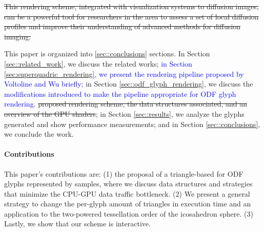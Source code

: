 \documentclass[twoside,twocolumn,10pt]{article}
\begin{document}
\sout{This rendering scheme, integrated with visualization systems to diffusion images, can be a powerful tool for researchers in the area to assess a set of local diffusion profiles and improve their understanding of advanced methods for diffusion imaging.}

This paper is organized into \ref{sec::conclusions} sections. In Section \ref{sec::related_work}, we discuss the related works; \textcolor{blue}{in Section \ref{sec:superquadric_rendering}, we present the rendering pipeline proposed by Voltoline and Wu briefly;} in Section \ref{sec::odf_glyph_rendering}, we discuss the \textcolor{blue}{modifications introduced to make the pipeline appropriate for ODF glyph rendering.} \sout{proposed rendering scheme, the data structures associated, and an overview of the GPU shaders}; in Section \ref{sec::results}, we analyze the glyphs generated and show performance measurements; and in  Section \ref{sec::conclusions}, we conclude the work.

\paragraph*{\textbf{Contributions}}

This paper's contributions are: (1) the proposal of a triangle-based for ODF glyphs represented by samples, where we discuss data structures and strategies that minimize the CPU-GPU data traffic bottleneck. (2) We present a general strategy to change the per-glyph amount of triangles in execution time and an application to the two-powered tessellation order of the icosahedron sphere. (3) Lastly, we show that our scheme is interactive.







\end{document}
